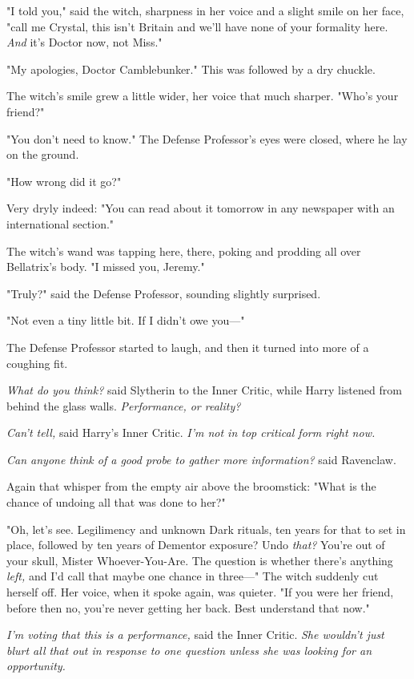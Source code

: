 "I told you," said the witch, sharpness in her voice and a slight smile on her
face, "call me Crystal, this isn't Britain and we'll have none of your
formality here. \emph{And} it's Doctor now, not Miss."

"My apologies, Doctor Camblebunker." This was followed by a dry chuckle.

The witch's smile grew a little wider, her voice that much sharper. "Who's your
friend?"

"You don't need to know." The Defense Professor's eyes were closed, where he
lay on the ground.

"How wrong did it go?"

Very dryly indeed: "You can read about it tomorrow in any newspaper with an
international section."

The witch's wand was tapping here, there, poking and prodding all over
Bellatrix's body. "I missed you, Jeremy."

"Truly?" said the Defense Professor, sounding slightly surprised.

"Not even a tiny little bit. If I didn't owe you---"

The Defense Professor started to laugh, and then it turned into more of a
coughing fit.

\emph{What do you think?} said Slytherin to the Inner Critic, while Harry
listened from behind the glass walls. \emph{Performance, or reality?}

\emph{Can't tell,} said Harry's Inner Critic. \emph{I'm not in top critical
form right now.}

\emph{Can anyone think of a good probe to gather more information?} said
Ravenclaw.

Again that whisper from the empty air above the broomstick: "What is the chance
of undoing all that was done to her?"

"Oh, let's see. Legilimency and unknown Dark rituals, ten years for that to set
in place, followed by ten years of Dementor exposure? Undo \emph{that?} You're
out of your skull, Mister Whoever-You-Are. The question is whether there's
anything \emph{left,} and I'd call that maybe one chance in three---" The witch
suddenly cut herself off. Her voice, when it spoke again, was quieter. "If you
were her friend, before{\el} then no, you're never getting her back. Best
understand that now."

\emph{I'm voting that this is a performance,} said the Inner Critic. \emph{She
wouldn't just blurt all that out in response to one question unless she was
looking for an opportunity.}

